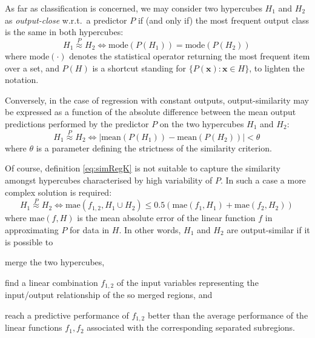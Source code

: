 \documentclass[
]{ceurart}
\begin{document}
As far as classification is concerned, we may consider two hypercubes $H_1$ and $H_2$ as \emph{output-close} w.r.t.\ a predictor $P$ if (and only if) the most frequent output class is the same in both hypercubes:
%
\begin{equation}\label{eq:simClass}
	H_1 \stackrel{P}{\approx} H_2 \Leftrightarrow \text{mode}(P(H_1)) = \text{mode}(P(H_2))\,
\end{equation}
%
where $\text{mode}(\cdot)$ denotes the statistical operator returning the most frequent item over a set, and $P(H)$ is a shortcut standing for $\{ P(\textbf{x}) : \textbf{x} \in H \}$, to lighten the notation.

Conversely, in the case of regression with constant outputs, output-similarity may be expressed as a function of the absolute difference between the mean output predictions performed by the predictor $P$ on the two hypercubes $H_1$ and $H_2$:
%
\begin{equation}\label{eq:simRegK}
	H_1 \stackrel{P}{\approx} H_2 \Leftrightarrow |\text{mean}(P(H_1)) - \text{mean}(P(H_2))| < \theta\,
\end{equation}
%
where $\theta$ is a parameter defining the strictness of the similarity criterion.

Of course, definition \ref{eq:simRegK} is not suitable to capture the similarity amongst hypercubes characterised by high variability of $P$.
%
In such a case a more complex solution is required:
%
\begin{equation}\label{eq:simRegLin}
	H_1 \stackrel{P}{\approx} H_2 \Leftrightarrow \text{mae}(f_{1,2}, H_1 \cup H_2) \leq 0.5 (\text{mae}(f_1, H_1) + \text{mae}(f_2, H_2)) \,
\end{equation}
%
where $\text{mae}(f, H)$ is the mean absolute error of the linear function $f$ in approximating 
$P$ for data in $H$.
%
In other words, $H_1$ and $H_2$ are output-similar if it is possible to
%
\begin{inlinelist}
	\item merge the two hypercubes, %
	\item find a linear combination $f_{1,2}$ of the input variables representing the input/output relationship of the so merged regions, and
	\item reach a predictive performance of $f_{1,2}$ better than the average performance of the linear functions $f_1, f_2$ associated with the corresponding separated subregions.
\end{inlinelist}
\end{document}
